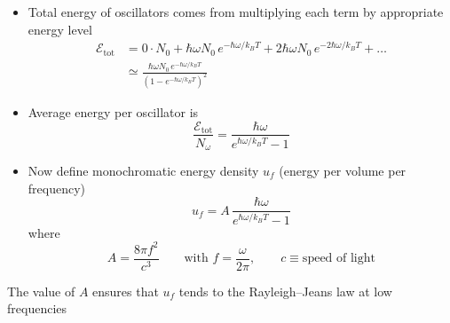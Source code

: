 \documentclass[11pt, oneside]{article}
\begin{document}
\begin{itemize}
	\item Total energy of oscillators comes from multiplying each term by appropriate energy level
	\begin{align}
		\mathcal{E}_\mathrm{tot} &= 0\cdot N_0 + \hbar\omega N_0\,e^{-\hbar\omega/k_BT} + 2\hbar\omega N_0\,e^{-2\hbar\omega/k_BT} + \ldots \nonumber\\
		&\simeq \frac{\hbar\omega N_0\,e^{-\hbar\omega/k_BT}}{\left(1 - e^{-\hbar\omega/k_BT}\right)^2} \label{e:Etot}
	\end{align}
	\item Average energy per oscillator is
	\begin{equation}
		\label{e:Eavg}
		\frac{\mathcal{E}_\mathrm{tot}}{N_\omega} = \frac{\hbar\omega}{e^{\hbar\omega/k_BT} - 1}
	\end{equation}
	\item Now define monochromatic energy density $u_f$ (energy per volume per frequency)
	\begin{equation}
		\label{e:uf}
		u_f = A\,\frac{\hbar\omega}{e^{\hbar\omega/k_BT} - 1}
	\end{equation}
	where
	\begin{equation*}
		A = \frac{8\pi f^2}{c^3} \qquad \text{with } f = \frac{\omega}{2\pi}, \qquad c \equiv \text{speed of light}
	\end{equation*}
\end{itemize}
The value of $A$ ensures that $u_f$ tends to the Rayleigh--Jeans law at low frequencies
\end{document}

